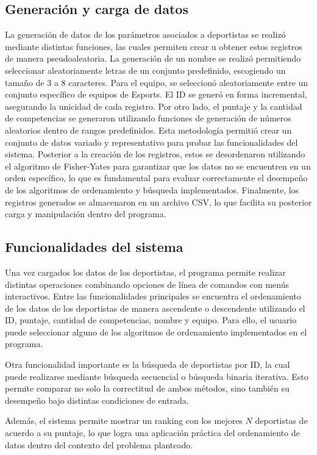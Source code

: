\subsection{Generación y carga de datos}
La generación de datos de los parámetros asociados a deportistas se realizó mediante distintas funciones, las cuales permiten crear u obtener estos registros de manera pseudoaleatoria. La generación de un nombre se realizó permitiendo seleccionar aleatoriamente letras de un conjunto predefinido, escogiendo un tamaño de 3 a 8 caracteres. Para el equipo, se seleccionó aleatoriamente entre un conjunto específico de equipos de Esports. El ID se generó en forma incremental, asegurando la unicidad de cada registro. Por otro lado, el puntaje y la cantidad de competencias se generaron utilizando funciones de generación de números aleatorios dentro de rangos predefinidos. Esta metodología permitió crear un conjunto de datos variado y representativo para probar las funcionalidades del sistema. Posterior a la creación de los registros, estos se desordenaron utilizando el algoritmo de Fisher-Yates para garantizar que los datos no se encuentren en un orden específico, lo que es fundamental para evaluar correctamente el desempeño de los algoritmos de ordenamiento y búsqueda implementados. Finalmente, los registros generados se almacenaron en un archivo CSV, lo que facilita su posterior carga y manipulación dentro del programa.


\subsection{Funcionalidades del sistema}
Una vez cargados los datos de los deportistas, el programa permite realizar distintas operaciones combinando opciones de línea de comandos con menús interactivos. Entre las funcionalidades principales se encuentra el ordenamiento de los datos de los deportistas de manera ascendente o descendente utilizando el ID, puntaje, cantidad de competencias, nombre y equipo. Para ello, el usuario puede seleccionar alguno de los algoritmos de ordenamiento implementados en el programa.

Otra funcionalidad importante es la búsqueda de deportistas por ID, la cual puede realizarse mediante búsqueda secuencial o búsqueda binaria iterativa. Esto permite comparar no solo la correctitud de ambos métodos, sino también su desempeño bajo distintas condiciones de entrada.

Además, el sistema permite mostrar un ranking con los mejores \(N\) deportistas de acuerdo a su puntaje, lo que logra una aplicación práctica del ordenamiento de datos dentro del contexto del problema planteado.

